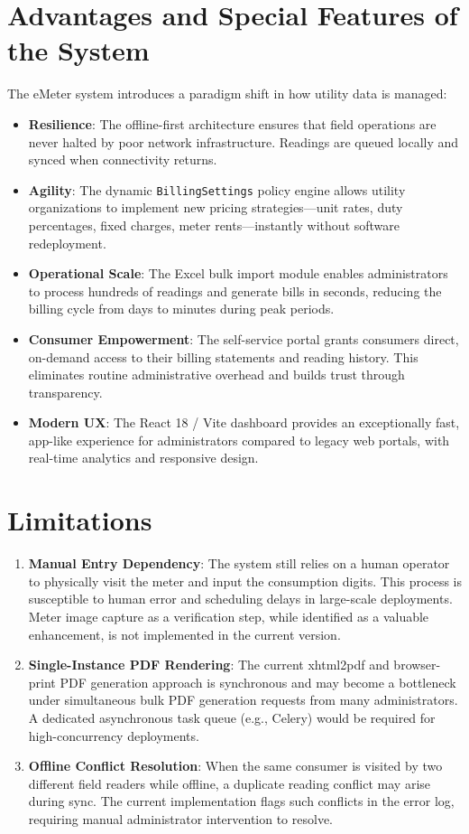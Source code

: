\documentclass[12pt, a4paper, onecolumn]{report}
\begin{document}
\section{Advantages and Special Features of the System}
The eMeter system introduces a paradigm shift in how utility data is managed:
\begin{itemize}
    \item \textbf{Resilience}: The offline-first architecture ensures that field operations are never halted by poor network infrastructure. Readings are queued locally and synced when connectivity returns.
    \item \textbf{Agility}: The dynamic \texttt{BillingSettings} policy engine allows utility organizations to implement new pricing strategies---unit rates, duty percentages, fixed charges, meter rents---instantly without software redeployment.
    \item \textbf{Operational Scale}: The Excel bulk import module enables administrators to process hundreds of readings and generate bills in seconds, reducing the billing cycle from days to minutes during peak periods.
    \item \textbf{Consumer Empowerment}: The self-service portal grants consumers direct, on-demand access to their billing statements and reading history. This eliminates routine administrative overhead and builds trust through transparency.
    \item \textbf{Modern UX}: The React 18 / Vite dashboard provides an exceptionally fast, app-like experience for administrators compared to legacy web portals, with real-time analytics and responsive design.
\end{itemize}

\section{Limitations}
\begin{enumerate}
    \item \textbf{Manual Entry Dependency}: The system still relies on a human operator to physically visit the meter and input the consumption digits. This process is susceptible to human error and scheduling delays in large-scale deployments. Meter image capture as a verification step, while identified as a valuable enhancement, is not implemented in the current version.
    \item \textbf{Single-Instance PDF Rendering}: The current xhtml2pdf and browser-print PDF generation approach is synchronous and may become a bottleneck under simultaneous bulk PDF generation requests from many administrators. A dedicated asynchronous task queue (e.g., Celery) would be required for high-concurrency deployments.
    \item \textbf{Offline Conflict Resolution}: When the same consumer is visited by two different field readers while offline, a duplicate reading conflict may arise during sync. The current implementation flags such conflicts in the error log, requiring manual administrator intervention to resolve.
\end{enumerate}
\end{document}
